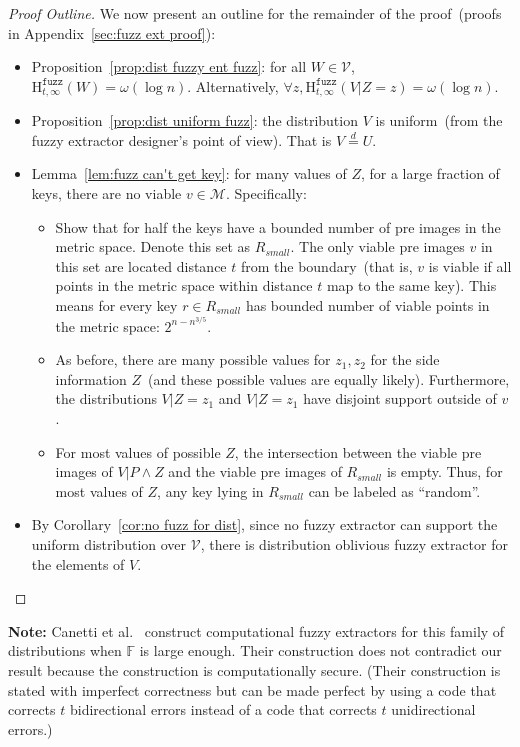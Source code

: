 \documentclass[11pt]{article}
\newcommand{\apref}[1]{\mbox{Appendix~\ref{#1}}}
\newcommand{\corref}[1]{\mbox{Corollary~\ref{#1}}}
\newcommand{\lemref}[1]{\mbox{Lemma~\ref{#1}}}
\newcommand{\propref}[1]{\mbox{Proposition~\ref{#1}}}
\newcommand{\Hfuzz}{\mathrm{H}^{\mathtt{fuzz}}_{t,\infty}}
\begin{document}
\begin{proof}[Proof Outline]
We now present an outline for the remainder of the proof~(proofs in \apref{sec:fuzz ext proof}):
\begin{itemize}
\item \propref{prop:dist fuzzy ent fuzz}: for all $W\in \mathcal{V}$, $\Hfuzz(W) = \omega (\log n)$. Alternatively, $\forall z, \Hfuzz(V | Z=z) = \omega(\log n)$.
\item \propref{prop:dist uniform fuzz}: the distribution $V$ is uniform~(from the fuzzy extractor designer's point of view).  That is $V\overset{d}=U$.
\item \lemref{lem:fuzz can't get key}: for many values of $Z$, for a large fraction of keys, there are no viable $v\in\mathcal{M}$.  Specifically:
\begin{itemize}
\item Show that for half the keys have a bounded number of pre images in the metric space.  Denote this set as $R_{small}$.  The only viable pre images $v$ in this set are located distance $t$ from the boundary~(that is, $v$ is viable if all points in the metric space within distance $t$ map to the same key).  This means for every key $r\in R_{small}$ has bounded number of viable points in the metric space: $2^{n-n^{3/5}}$.
\item As before, there are many possible values for $z_1, z_2$ for the side information $Z$~(and these possible values are equally likely).  Furthermore, the distributions $V|Z=z_1 $ and $V| Z=z_1$ have disjoint support outside of $v$.
\item For most values of possible $Z$, the intersection between the viable pre images of $V|P \wedge Z$ and the viable pre images of $R_{small}$ is empty.  Thus, for most values of $Z$, any key lying in $R_{small}$ can be labeled as ``random''.
\end{itemize}
\item By \corref{cor:no fuzz for dist}, since no fuzzy extractor can support the uniform distribution over $\mathcal{V}$, there is distribution oblivious fuzzy extractor for the elements of $V$.
\end{itemize}

\end{proof}

\noindent
\textbf{Note:} Canetti et al.~\cite[Construction 5.3]{canetti2014key} construct computational fuzzy extractors for this family of distributions when $\mathbb{F}$ is large enough.  Their construction does not contradict our result because the construction is computationally secure.  (Their construction is stated with imperfect correctness but can be made perfect by using a code that corrects $t$ bidirectional errors instead of a code that corrects $t$ unidirectional errors.)
\end{document}
